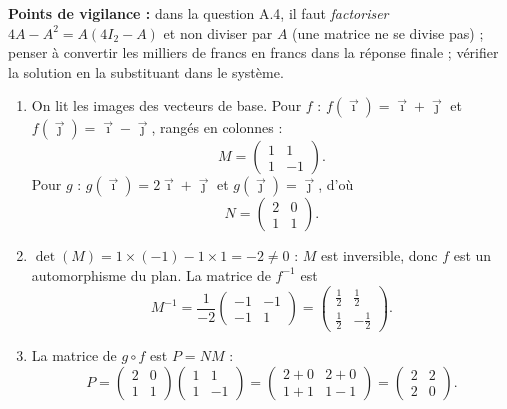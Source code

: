 \documentclass[11pt]{article}
\begin{document}
\begin{corrige}
\textbf{Points de vigilance :} dans la question A.4, il faut \emph{factoriser} $4A-A^2=A(4I_2-A)$ et non diviser par $A$ (une matrice ne se divise pas) ; penser à convertir les milliers de francs en francs dans la réponse finale ; vérifier la solution en la substituant dans le système.
\end{corrige}

\begin{corrige}
\begin{enumerate}
\item On lit les images des vecteurs de base. Pour $f$ : $f(\vec{\imath})=\vec{\imath}+\vec{\jmath}$ et $f(\vec{\jmath})=\vec{\imath}-\vec{\jmath}$, rangés en colonnes :
\[ M=\begin{pmatrix} 1 & 1 \\ 1 & -1 \end{pmatrix}. \]
Pour $g$ : $g(\vec{\imath})=2\vec{\imath}+\vec{\jmath}$ et $g(\vec{\jmath})=\vec{\jmath}$, d'où
\[ N=\begin{pmatrix} 2 & 0 \\ 1 & 1 \end{pmatrix}. \]

\item $\det(M)=1\times(-1)-1\times1=-2\neq0$ : $M$ est inversible, donc $f$ est un automorphisme du plan. La matrice de $f^{-1}$ est
\[ M^{-1}=\frac{1}{-2}\begin{pmatrix} -1 & -1 \\ -1 & 1 \end{pmatrix}=\begin{pmatrix} \tfrac{1}{2} & \tfrac{1}{2} \\[2pt] \tfrac{1}{2} & -\tfrac{1}{2} \end{pmatrix}. \]

\item La matrice de $g\circ f$ est $P=NM$ :
\[ P=\begin{pmatrix} 2 & 0 \\ 1 & 1 \end{pmatrix}\begin{pmatrix} 1 & 1 \\ 1 & -1 \end{pmatrix}=\begin{pmatrix} 2+0 & 2+0 \\ 1+1 & 1-1 \end{pmatrix}=\begin{pmatrix} 2 & 2 \\ 2 & 0 \end{pmatrix}. \]


\end{enumerate}
\end{corrige}
\end{document}
